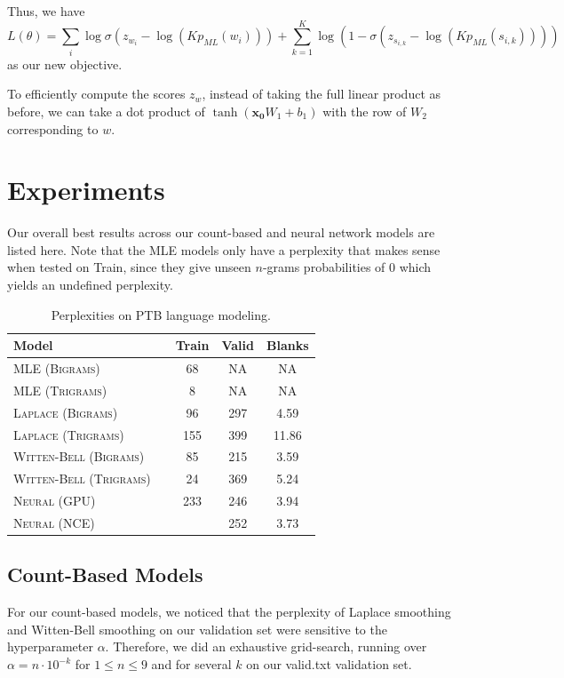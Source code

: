 \documentclass[11pt]{article}
\begin{document}
Thus, we have
$$L(\theta) = \sum_i \log \sigma(z_{w_i} - \log (Kp_{ML}(w_i))) + \sum_{k=1}^K \log(1 - \sigma(z_{s_{i,k}} - \log(Kp_{ML}(s_{i,k}))))$$
as our new objective.

To efficiently compute the scores $z_{w}$, instead of taking the full linear product as before, we can take a dot product of $\tanh(\mathbf{x_0}W_1 + b_1)$ with the row of $W_2$ corresponding to $w$.

\section{Experiments}

Our overall best results across our count-based and neural network models are listed here. Note that the MLE models only have a perplexity that makes sense when tested on Train, since they give unseen $n$-grams probabilities of $0$ which yields an undefined perplexity.

\begin{table}[h]
\centering
\begin{tabular}{llccc}
 \toprule
 Model &  & Train & Valid & Blanks\\
 \midrule
 \textsc{MLE (Bigrams)} & & 68 & NA & NA \\
 \textsc{MLE (Trigrams)} & & 8 & NA & NA \\
 \textsc{Laplace (Bigrams)} & & 96 & 297 & 4.59 \\
 \textsc{Laplace (Trigrams)} & & 155 & 399 & 11.86 \\
\textsc{Witten-Bell (Bigrams)} & & 85 & 215 & 3.59 \\
\textsc{Witten-Bell (Trigrams)} & & 24 & 369 & 5.24 \\
 \textsc{Neural (GPU)} & & 233 & 246 & 3.94\\
 \textsc{Neural (NCE)} & & & 252 & 3.73 \\
 \bottomrule
\end{tabular}
\caption{\label{tab:results} Perplexities on PTB language modeling.}
\end{table}

\subsection{Count-Based Models}


For our count-based models, we noticed that the perplexity of Laplace smoothing and Witten-Bell smoothing on our validation set were sensitive to the hyperparameter $\alpha$. Therefore, we did an exhaustive grid-search, running over $\alpha = n \cdot 10^{-k}$ for $1 \leq n \leq 9$ and for several $k$ on our valid.txt validation set. 
\end{document}
